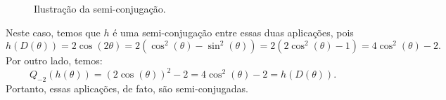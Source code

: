 \documentclass[../IC.tex]{subfiles}
\begin{document}
\begin{exemplo}
\begin{figure}[H]
			\caption{Ilustração da semi-conjugação.}
			\label{semiConjugacao}
		\end{figure}
		
		Neste caso, temos que $h$ é uma semi-conjugação entre essas duas aplicações, pois
		$$ h(D(\theta)) = 2\cos(2\theta) = 2(\cos^2(\theta) - \sin^2(\theta)) = 2(2\cos^2(\theta) - 1) = 4\cos^2(\theta) - 2. $$
		Por outro lado, temos:
		$$ Q_{-2}(h(\theta)) = (2\cos(\theta))^2 - 2 = 4\cos^2(\theta) - 2 = h(D(\theta)). $$
		Portanto, essas aplicações, de fato, são semi-conjugadas.
	\end{exemplo}
\end{document}
